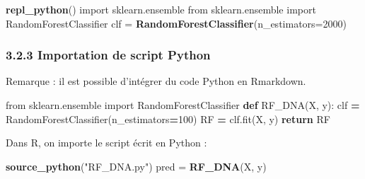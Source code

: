 \documentclass[]{article}
\newenvironment{Shaded}{\begin{snugshade}}{\end{snugshade}}
\newcommand{\ControlFlowTok}[1]{\textcolor[rgb]{0.13,0.29,0.53}{\textbf{#1}}}
\newcommand{\DataTypeTok}[1]{\textcolor[rgb]{0.13,0.29,0.53}{#1}}
\newcommand{\DecValTok}[1]{\textcolor[rgb]{0.00,0.00,0.81}{#1}}
\newcommand{\ImportTok}[1]{#1}
\newcommand{\KeywordTok}[1]{\textcolor[rgb]{0.13,0.29,0.53}{\textbf{#1}}}
\newcommand{\NormalTok}[1]{#1}
\newcommand{\OperatorTok}[1]{\textcolor[rgb]{0.81,0.36,0.00}{\textbf{#1}}}
\newcommand{\StringTok}[1]{\textcolor[rgb]{0.31,0.60,0.02}{#1}}
\begin{document}
\begin{Shaded}
\begin{Highlighting}[]
\KeywordTok{repl\_python}\NormalTok{()}
\NormalTok{import sklearn.ensemble}
\NormalTok{from sklearn.ensemble import RandomForestClassifier}
\NormalTok{clf =}\StringTok{ }\KeywordTok{RandomForestClassifier}\NormalTok{(}\DataTypeTok{n\_estimators=}\DecValTok{2000}\NormalTok{)}
\end{Highlighting}
\end{Shaded}

\hypertarget{importation-de-script-python}{%
\subsubsection{3.2.3 Importation de script
Python}\label{importation-de-script-python}}

Remarque : il est possible d'intégrer du code Python en Rmarkdown.

\begin{Shaded}
\begin{Highlighting}[]
\ImportTok{from}\NormalTok{ sklearn.ensemble }\ImportTok{import}\NormalTok{ RandomForestClassifier}
  \KeywordTok{def}\NormalTok{ RF\_DNA(X, y):}
\NormalTok{  clf }\OperatorTok{=}\NormalTok{ RandomForestClassifier(n\_estimators}\OperatorTok{=}\DecValTok{100}\NormalTok{)}
\NormalTok{  RF }\OperatorTok{=}\NormalTok{ clf.fit(X, y)}
  \ControlFlowTok{return}\NormalTok{ RF}
\end{Highlighting}
\end{Shaded}

Dans R, on importe le script écrit en Python :

\begin{Shaded}
\begin{Highlighting}[]
\KeywordTok{source\_python}\NormalTok{(}\StringTok{"RF\_DNA.py"}\NormalTok{)}
\NormalTok{pred =}\StringTok{ }\KeywordTok{RF\_DNA}\NormalTok{(X, y)}
\end{Highlighting}
\end{Shaded}
\end{document}
